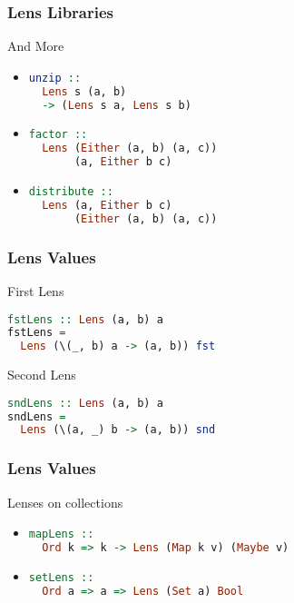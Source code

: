 \begin{frame}[fragile]
\frametitle{Lens Libraries}

\begin{block}{And More}
\begin{itemize}
\item \begin{lstlisting}[language=haskell]
unzip ::
  Lens s (a, b)
  -> (Lens s a, Lens s b)
\end{lstlisting}

\item \begin{lstlisting}[language=haskell]
factor ::
  Lens (Either (a, b) (a, c)) 
       (a, Either b c)
\end{lstlisting}

\item \begin{lstlisting}[language=haskell]
distribute ::
  Lens (a, Either b c)
       (Either (a, b) (a, c))
\end{lstlisting}
\end{itemize}
\end{block}

\end{frame}

\begin{frame}[fragile]
\frametitle{Lens Values}

\begin{block}{First Lens}
\begin{lstlisting}[language=haskell]
fstLens :: Lens (a, b) a
fstLens =
  Lens (\(_, b) a -> (a, b)) fst
\end{lstlisting}
\end{block}
\begin{block}{Second Lens}
\begin{lstlisting}[language=haskell]
sndLens :: Lens (a, b) a
sndLens =
  Lens (\(a, _) b -> (a, b)) snd
\end{lstlisting}
\end{block}

\end{frame}

\begin{frame}[fragile]
\frametitle{Lens Values}

\begin{block}{Lenses on collections}
\begin{itemize}
\item \begin{lstlisting}[language=haskell]
mapLens ::
  Ord k => k -> Lens (Map k v) (Maybe v)
\end{lstlisting}

\item \begin{lstlisting}[language=haskell]
setLens ::
  Ord a => a => Lens (Set a) Bool
\end{lstlisting}
\end{itemize}
\end{block}

\end{frame}

